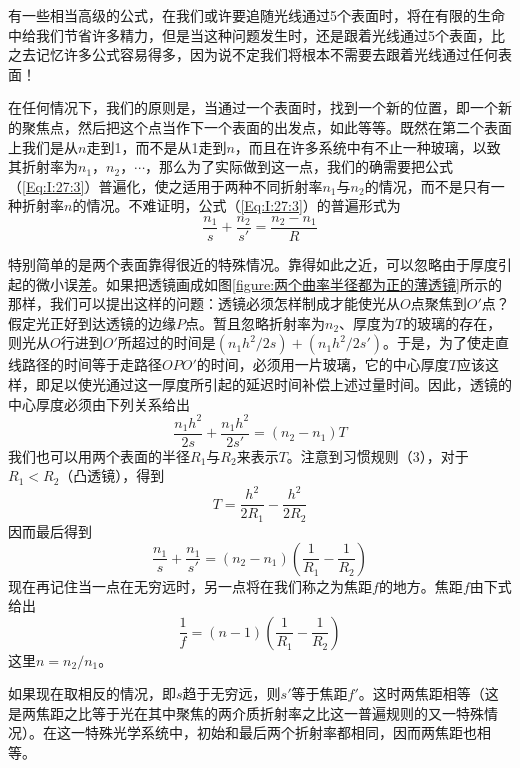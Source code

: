 有一些相当高级的公式，在我们或许要追随光线通过5个表面时，将在有限的生命中给我们节省许多精力，但是当这种问题发生时，还是跟着光线通过5个表面，比之去记忆许多公式容易得多，因为说不定我们将根本不需要去跟着光线通过任何表面！

在任何情况下，我们的原则是，当通过一个表面时，找到一个新的位置，即一个新的聚焦点，然后把这个点当作下一个表面的出发点，如此等等。既然在第二个表面上我们是从$n$走到1，而不是从1走到$n$，而且在许多系统中有不止一种玻璃，以致其折射率为$n_1$，$n_2$，$\cdots$，那么为了实际做到这一点，我们的确需要把公式（\ref{Eq:I:27:3}）普遍化，使之适用于两种不同折射率$n_1$与$n_2$的情况，而不是只有一种折射率$n$的情况。不难证明，公式（\ref{Eq:I:27:3}）的普遍形式为
\begin{equation}
    \label{Eq:I:27:7}
    \frac{n_1}{s} + \frac{n_2}{s'} = \frac{n_2-n_1}{R}
\end{equation}

特别简单的是两个表面靠得很近的特殊情况。靠得如此之近，可以忽略由于厚度引起的微小误差。如果把透镜画成如图\ref{figure:两个曲率半径都为正的薄透镜}所示的那样，我们可以提出这样的问题：透镜必须怎样制成才能使光从$O$点聚焦到$O'$点？假定光正好到达透镜的边缘$P$点。暂且忽略折射率为$n_2$、厚度为$T$的玻璃的存在，则光从$O$行进到$O'$所超过的时间是$(n_1h^2/2s)+(n_1h^2/2s')$。于是，为了使走直线路径的时间等于走路径$OPO'$的时间，必须用一片玻璃，它的中心厚度$T$应该这样，即足以使光通过这一厚度所引起的延迟时间补偿上述过量时间。因此，透镜的中心厚度必须由下列关系给出
\begin{equation}
    \label{Eq:I:27:8}
    \frac{n_1h^2}{2s} + \frac{n_1h^2}{2s'} = (n_2 - n_1)T
\end{equation}
我们也可以用两个表面的半径$R_1$与$R_2$来表示$T$。注意到习惯规则（3），对于$R_1<R_2$（凸透镜），得到
\begin{equation}
    \label{Eq:I:27:9}
    T=\frac{h^2}{2R_1} - \frac{h^2}{2R_2}
\end{equation}
因而最后得到
\begin{equation}
    \label{Eq:I:27:10}
    \frac{n_1}{s} + \frac{n_1}{s'} = (n_2-n_1)\left ( \frac{1}{R_1}-\frac{1}{R_2} \right )
\end{equation}
现在再记住当一点在无穷远时，另一点将在我们称之为焦距$f$的地方。焦距$f$由下式给出
\begin{equation}
    \label{Eq:I:27:11}
    \frac{1}{f} = (n-1)\left ( \frac{1}{R_1}-\frac{1}{R_2} \right )
\end{equation}
这里$n=n_2/n_1$。

如果现在取相反的情况，即$s$趋于无穷远，则$s'$等于焦距$f'$。这时两焦距相等（这是两焦距之比等于光在其中聚焦的两介质折射率之比这一普遍规则的又一特殊情况）。在这一特殊光学系统中，初始和最后两个折射率都相同，因而两焦距也相等。

